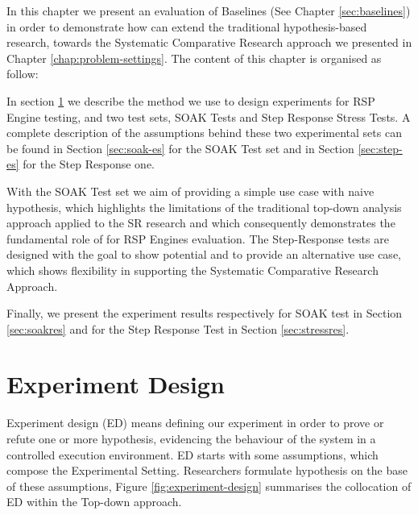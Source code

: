 In this chapter we present an evaluation of \name Baselines (See Chapter \ref{sec:baselines}) in order to demonstrate how \name can extend the traditional hypothesis-based research, towards the Systematic Comparative Research approach we presented in Chapter \ref{chap:problem-settings}. The content of this chapter is organised as follow:

In section \ref{sec:experiment-design} we describe the method we use to design experiments for RSP Engine testing, and two test sets, SOAK Tests and Step Response Stress Tests. A complete description of the assumptions behind these two experimental sets can be found in Section \ref{sec:soak-es} for the SOAK Test set and in Section \ref{sec:step-es} for the Step Response one. 

With the SOAK Test set we aim of providing a simple use case with naive hypothesis, which highlights the limitations of the traditional top-down analysis approach applied to the SR research and which consequently demonstrates the fundamental role of \name  for RSP Engines evaluation.  The Step-Response tests are designed with the goal to show \name potential and to provide an alternative use case, which shows \name flexibility in supporting the Systematic Comparative Research Approach.

Finally, we present the experiment results respectively for SOAK test in Section \ref{sec:soakres} and for the Step Response Test in Section \ref{sec:stressres}.

\section{Experiment Design}\label{sec:experiment-design}

Experiment design (ED) means defining our experiment in order to prove or refute one or more hypothesis, evidencing the behaviour of the system in a controlled execution environment. ED starts with some assumptions, which compose the  Experimental Setting. Researchers formulate hypothesis on the base of these assumptions, Figure \ref{fig:experiment-design} summarises the collocation of ED within the Top-down approach.

